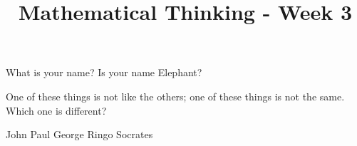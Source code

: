 \documentclass[12pt]{exam}
\title{Mathematical Thinking - Week 3}
\begin{document}
\maketitle
\tableofcontents
\pointsinrightmargin
\begin{questions}
\question[1] What is your name?
\question[1] Is your name Elephant?
\question
One of these things is not like the others; one of these things is not
the same. Which one is different?
\begin{choices}
\choice John
\choice Paul
\choice George
\choice Ringo
\choice Socrates
\end{choices}
\end{questions}
\end{document}
